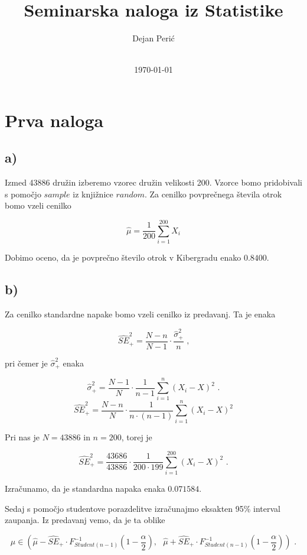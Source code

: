 \documentclass[12pt, a4paper]{article}
\title{Seminarska naloga iz Statistike}
\author{Dejan Perić \\~ \\ }
\date{\today}
\begin{document}

\maketitle




\section*{Prva naloga}
    
\subsection*{a)}

Izmed 43886 družin izberemo vzorec družin velikosti 200. Vzorce bomo pridobivali s pomočjo $sample$ iz knjižnice $random$. Za cenilko povprečnega števila otrok bomo vzeli cenilko

$$\hat{\mu} = \frac{1}{200}\sum^{200}_{i=1} X_i $$

Dobimo oceno, da je povprečno število otrok v Kibergradu enako $0.8400$.

\subsection*{b)}

Za cenilko standardne napake bomo vzeli cenilko iz predavanj. Ta je enaka 

$$ \widehat{SE}_+^2 = \frac{N-n}{N-1} \cdot \frac{\hat{\sigma}_+^2}{n} \text{ ,}$$

pri čemer je $\hat{\sigma}_+^2$ enaka 

$$\hat{\sigma}_+^2 = \frac{N-1}{N} \cdot \frac{1}{n-1} \sum_{i=1}^{n} (X_i - X)^2 \text{ .} $$ $$
\widehat{SE}_+^2 = \frac{N-n}{N} \cdot \frac{1}{n\cdot(n-1)} \sum_{i=1}^{n} (X_i - X)^2
$$

Pri nas je $ N = 43886 $ in $ n = 200 $, torej je

$$ \widehat{SE}_+^2 = \frac{43686}{43886} \cdot \frac{1}{200\cdot199} \sum_{i=1}^{200} (X_i - X)^2 \text{ .}
$$

Izračunamo, da je standardna napaka enaka $ 0.071584 $.

Sedaj s pomočjo studentove porazdelitve izračunajmo eksakten 95\% interval zaupanja.
Iz predavanj vemo, da je ta oblike

$$ \mu \in (\hat{\mu} - \widehat{SE}_+ \cdot F^{-1}_{Student(n-1)}(1-\frac{\alpha}{2}), \text{ }\hat{\mu} + \widehat{SE}_+ \cdot F^{-1}_{Student(n-1)}(1-\frac{\alpha}{2}) ) \text{ .}
$$
\end{document}
